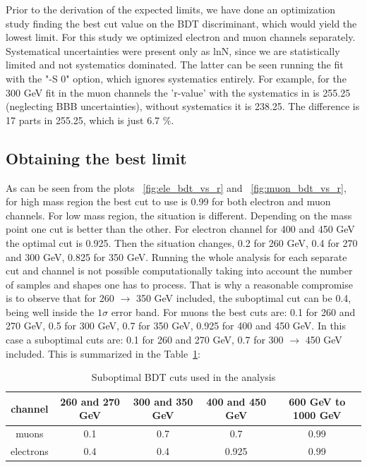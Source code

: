 
Prior to the derivation of the expected limits, we have done an optimization study finding the best cut value on the BDT discriminant, which would yield the lowest limit. For this study we optimized electron and muon channels separately. Systematical uncertainties were present only as lnN, since we are statistically limited and not systematics dominated. The latter can be seen running the fit with the "-S 0" option, which ignores systematics entirely. For example, for the 300 GeV fit in the muon channels the 'r-value' with the systematics in is 255.25 (neglecting BBB uncertainties), without systematics it is 238.25. The difference is 17 parts in 255.25, which is just 6.7 $\%$.

\subsection{Obtaining the best limit}

As can be seen from the plots ~\ref{fig:ele_bdt_vs_r} and ~\ref{fig:muon_bdt_vs_r}, for high mass region the best cut to use is 0.99 for both electron and muon channels. For low mass region, the situation is different. Depending on the mass point one cut is better than the other. For electron channel for 400 and 450 GeV the optimal cut is 0.925. Then the situation changes, 0.2 for 260 GeV, 0.4 for 270 and 300 GeV, 0.825 for 350 GeV. Running the whole analysis for each separate cut and channel is not possible computationally taking into account the number of samples and shapes one has to process. That is why a reasonable compromise is to observe that for 260 $\to$ 350 GeV included, the suboptimal cut can be 0.4, being well inside the $1\sigma$ error band. For muons the best cuts are: 0.1 for 260 and 270 GeV, 0.5 for 300 GeV, 0.7 for 350 GeV, 0.925 for 400 and 450 GeV. In this case a suboptimal cuts are: 0.1 for 260 and 270 GeV, 0.7 for 300 $\to$ 450 GeV included. This is summarized in the Table~\ref{suboptCut}:

\begin{table}
\begin{center} 
  \caption{Suboptimal BDT cuts used in the analysis}
 \begin{tabular}{ |c|c|c|c|c| } \hline%
   channel & 260 and 270 GeV & 300 and 350 GeV & 400 and 450 GeV & 600 GeV to 1000 GeV \\ \hline
   muons & 0.1 & 0.7 & 0.7 & 0.99 \\ %
   electrons & 0.4 & 0.4 & 0.925 & 0.99\\ \hline%
  \end{tabular}
  \label{suboptCut}
\end{center}   
\end{table}

